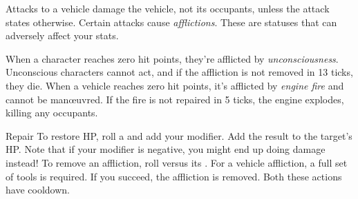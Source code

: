 
Attacks to a vehicle damage the vehicle, not its occupants, unless the attack states otherwise. Certain attacks cause \emph{afflictions}. These are statuses that can adversely affect your stats.

When a character reaches zero hit points, they're afflicted by \emph{unconsciousness}. Unconscious characters cannot act, and if the affliction is not removed in 13 ticks, they die. When a vehicle reaches zero hit points, it's afflicted by \emph{engine fire} and cannot be man\oe{}uvred. If the fire is not repaired in 5 ticks, the engine explodes, killing any occupants.

\begin{abstractsection}{Repair}
To restore HP, roll a  and add your  modifier. Add the result to the target's HP. Note that if your modifier is negative, you might end up doing damage instead! To remove an affliction, roll  versus its . For a vehicle affliction, a full set of tools is required. If you succeed, the affliction is removed. Both these actions have  cooldown.
\end{abstractsection}
